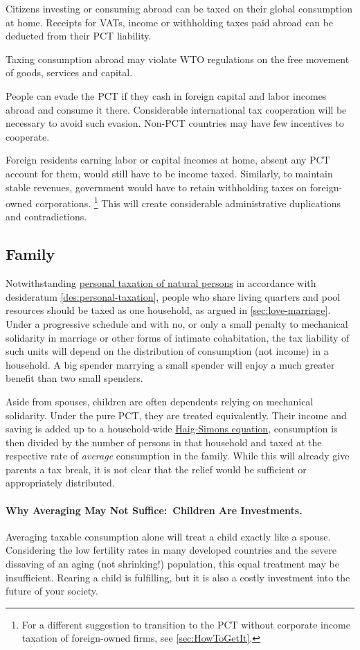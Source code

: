 Citizens investing or consuming abroad can be taxed on their global consumption at home.
Receipts for VATs, income or withholding taxes paid abroad can be deducted from their PCT liability.

Taxing consumption abroad may violate WTO regulations on the free movement of goods, services and capital.

People can evade the PCT if they cash in foreign capital and labor incomes abroad and consume it there.
Considerable international tax cooperation will be necessary to avoid such evasion.
Non-PCT countries may have few incentives to cooperate.

Foreign residents earning labor or capital incomes at home, absent any PCT account for them, would still have to be income taxed.
Similarly, to maintain stable revenues, government would have to retain withholding taxes on foreign-owned corporations.
\footnote{
	For a different suggestion to transition to the PCT without corporate income taxation of foreign-owned firms, see \autoref{sec:HowToGetIt}.
}
This will create considerable administrative duplications and contradictions.

\subsection{Family}
Notwithstanding \hyperref[des:personal-taxation]{personal taxation of natural persons} in accordance with desideratum \ref{des:personal-taxation}, people who share living quarters and pool resources should be taxed as one household, as argued in \autoref{sec:love-marriage}.
Under a progressive schedule and with no, or only a small penalty to mechanical solidarity in marriage or other forms of intimate cohabitation, the tax liability of such units will depend on the distribution of consumption (not income) in a household.
A big spender marrying a small spender will enjoy a much greater benefit than two small spenders.

Aside from spouses, children are often dependents relying on mechanical solidarity.
Under the pure PCT, they are treated equivalently.
Their income and saving is added up to a household-wide \hyperref[eq:HaigSimons]{Haig-Simons equation}, consumption is then divided by the number of persons in that household and taxed at the respective rate of \emph{average} consumption in the family.
While this will already give parents a tax break, it is not clear that the relief would be sufficient or appropriately distributed.

\paragraph{Why Averaging May Not Suffice:~Children Are Investments.}
Averaging taxable consumption alone will treat a child exactly like a spouse.
Considering the low fertility rates in many developed countries and the severe dissaving of an aging (not shrinking!) population, this equal treatment may be insufficient.
Rearing a child is fulfilling, but it is also a costly investment into the future of your society.

